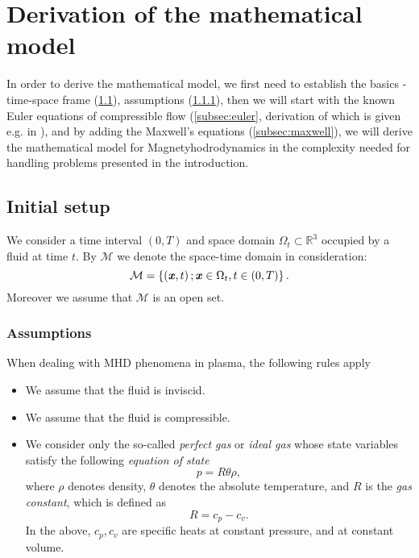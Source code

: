 \section{Derivation of the mathematical model}
In order to derive the mathematical model, we first need to establish the basics - time-space frame (\cref{subsec:init}), assumptions (\cref{subsec:assump}), then we will start with the known Euler equations of compressible flow (\cref{subsec:euler}, derivation of which is given e.g. in \cite{diplomka}), and by adding the Maxwell's equations (\cref{subsec:maxwell}), we will derive the mathematical model for Magnetyhodrodynamics in the complexity needed  for handling problems presented in the introduction.
\subsection{Initial setup}
\label{subsec:init}

We consider a time interval $\left(0,T\right)$ and space domain $\Omega_{t}\subset \mathbb{R}^3$ occupied by a fluid at time $t$.
By $\mathcal{M}$ we denote the space-time domain in consideration: 
\begin{equation}\label{M}
\mathcal{M}=\left\{\left(\textbf{\textit{x}},t\right);\\\textbf{\textit{x}}\in\Omega_{t},t\in\left(0,T\right)\right \}.
\end{equation}
Moreover we assume that $\mathcal{M}$ is an open set.

\subsubsection{Assumptions}
\label{subsec:assump}
When dealing with MHD phenomena in plasma, the following rules apply
\begin{itemize}
    \item We assume that the fluid is inviscid.
    \item We assume that the fluid is compressible.
    \item We consider only the so-called \textit{perfect gas} or \textit{ideal gas} whose state variables satisfy the following \textit{equation of state}
    \begin{equation}\label{start_therm}
    p = R\theta\rho,
    \end{equation}
    where $\rho$ denotes density, $\theta$ denotes the absolute temperature, and $R$ is the \textit{gas constant}, which is defined as 
    \begin{equation}
    R = c_p - c_v.
    \end{equation}
    In the above, $c_p, c_v$ are specific heats at constant pressure, and at constant volume.
\end{itemize}

